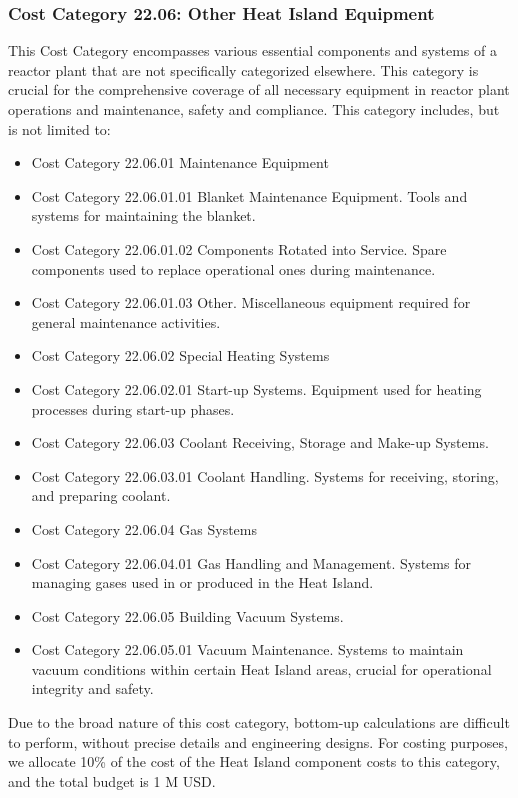 \subsubsection{Cost Category 22.06: Other Heat Island Equipment}

This Cost Category encompasses various essential components and systems of a reactor plant that are not specifically categorized elsewhere. This category is crucial for the comprehensive coverage of all necessary equipment in reactor plant operations and maintenance, safety and compliance.  This category includes, but is not limited to:


\begin{itemize}
    \item Cost Category 22.06.01 Maintenance Equipment
    \item Cost Category 22.06.01.01 Blanket Maintenance Equipment. Tools and systems for maintaining the blanket.
    \item Cost Category 22.06.01.02 Components Rotated into Service. Spare components used to replace operational ones during maintenance.
    \item Cost Category 22.06.01.03 Other. Miscellaneous equipment required for general maintenance activities.
    \item Cost Category 22.06.02 Special Heating Systems
    \item Cost Category 22.06.02.01 Start-up Systems. Equipment used for heating processes during start-up phases.
    \item Cost Category 22.06.03 Coolant Receiving, Storage and Make-up Systems.
    \item Cost Category 22.06.03.01 Coolant Handling. Systems for receiving, storing, and preparing coolant.
    \item Cost Category 22.06.04 Gas Systems
    \item Cost Category 22.06.04.01 Gas Handling and Management. Systems for managing gases used in or produced in the Heat Island.
    \item Cost Category 22.06.05 Building Vacuum Systems.
    \item Cost Category 22.06.05.01 Vacuum Maintenance. Systems to maintain vacuum conditions within certain Heat Island areas, crucial for operational integrity and safety.
\end{itemize}

Due to the broad nature of this cost category, bottom-up calculations are difficult to perform, without precise details and engineering designs. For costing purposes, we allocate 10\% of the cost of the Heat Island component costs to this category, and the total budget is 1 M USD.